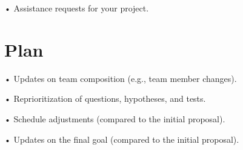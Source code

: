\documentclass[12pt]{article}
\begin{document}
• Assistance requests for your project.
\section{Plan}

• Updates on team composition (e.g., team member changes).

• Reprioritization of questions, hypotheses, and tests.

• Schedule adjustments (compared to the initial proposal).

• Updates on the final goal (compared to the initial proposal).




\end{document}
